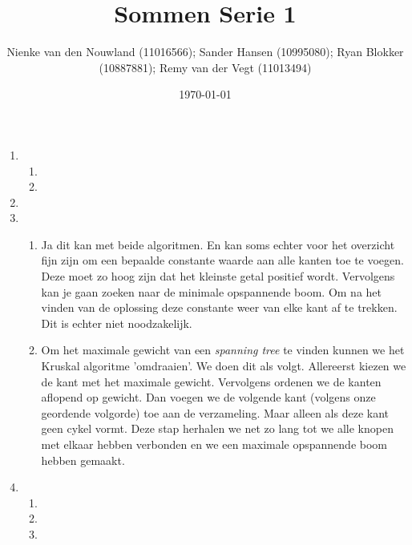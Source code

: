 \documentclass{article}
\title{Sommen Serie 1}
\author{Nienke van den Nouwland (11016566); Sander Hansen (10995080); Ryan Blokker (10887881); Remy van der Vegt
(11013494)}
\date{\today}
\begin{document}
\maketitle
\begin{enumerate}
    \item
    \begin{enumerate}
        \item
        \item
    \end{enumerate}
    \item
    \item
    \begin{enumerate}
        \item Ja dit kan met beide algoritmen. En kan soms echter voor het overzicht fijn zijn om een bepaalde constante
        waarde aan alle kanten toe te voegen. Deze moet zo hoog zijn dat het kleinste getal positief wordt. Vervolgens kan
        je gaan zoeken naar de minimale opspannende boom. Om na het vinden van de oplossing deze constante weer van elke
        kant af te trekken. Dit is echter niet noodzakelijk.
        \item Om het maximale gewicht van een \textit{spanning tree} te vinden kunnen we het Kruskal algoritme 'omdraaien'.
        We doen dit als volgt. Allereerst kiezen we de kant met het maximale gewicht. Vervolgens ordenen we de kanten
        aflopend op gewicht. Dan voegen we de volgende kant (volgens onze geordende volgorde) toe aan de verzameling. Maar
        alleen als deze kant geen cykel vormt. Deze stap herhalen we net zo lang tot we alle knopen met elkaar
        hebben verbonden en we een maximale opspannende boom hebben gemaakt.
    \end{enumerate}
    \item
    \begin{enumerate}
        \item
        \item
        \item
    \end{enumerate}
\end{enumerate}
\end{document}
